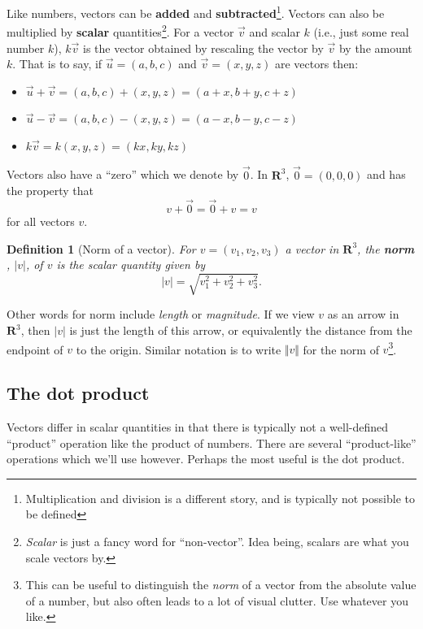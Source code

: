 \documentclass[12pt]{article}
\numberwithin{equation}{subsection}
\numberwithin{figure}{subsection}
\newtheorem{defn}[subsection]{Definition}
\theoremstyle{note}
\begin{document}
{Like numbers, vectors can be \textbf{added} and \textbf{subtracted}\footnote{Multiplication and division is a different story, and is typically not possible to be defined}. Vectors can also be multiplied by \textbf{scalar} quantities\footnote{\textit{Scalar} is just a fancy word for ``non-vector''. Idea being, scalars are what you scale vectors by.}. For a vector $\vec{v}$ and scalar $k$ (i.e., just some real number $k$), $k\vec{v}$ is the vector obtained by rescaling the vector by $\vec{v}$ by the amount $k$. That is to say, if $\vec{u}=(a,b,c)$ and $\vec{v}=(x,y,z)$ are vectors then:
\begin{itemize}
	\item $\vec{u}+\vec{v}=(a,b,c)+(x,y,z)=(a+x,b+y,c+z)$
	\item $\vec{u}-\vec{v}=(a,b,c)-(x,y,z)=(a-x,b-y,c-z)$
	\item $k\vec{v}=k(x,y,z)=(kx,ky,kz)$
\end{itemize}	

Vectors also have a ``zero'' which we denote by $\vec{0}$. In $\mathbf{R}^3$, $\vec{0}=(0,0,0)$ and has the property that \[ {v}+\vec{0}=\vec{0}+{v}={v}\] for all vectors ${v}$. 

\begin{defn}[Norm of a vector] For $v=(v_1,v_2,v_3)$ a vector in $\mathbf{R}^3$, the \textbf{norm} , $|v|$, of $v$ is the scalar quantity given by \begin{equation} |v|=\sqrt{v_1^2+v_2^2+v_3^2}.\end{equation}
\end{defn}

Other words for {norm} include \textit{length} or \textit{magnitude}. If we view $v$ as an arrow in $\mathbf{R}^3$, then $|v|$ is just the length of this arrow, or equivalently the distance from the endpoint of $v$ to the origin. Similar notation is to write $\Vert v \Vert$ for the norm of $v$\footnote{This can be useful to distinguish the \textit{norm} of a vector from the absolute value of a number, but also often leads to a lot of visual clutter. Use whatever you like.}.



\subsection{The dot product} Vectors differ in scalar quantities in that there is typically not a well-defined ``product'' operation like the product of numbers. There are several ``product-like'' operations which we'll use however. Perhaps the most useful is the {dot product}. 

}
\end{document}
